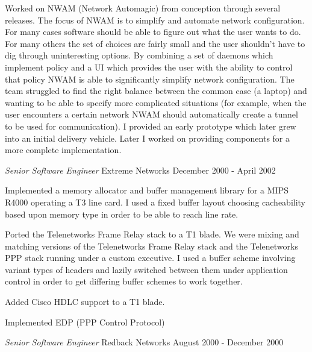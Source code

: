 \documentclass[margin]{res}
\begin{document}
\begin{resume}
                Worked on NWAM (Network Automagic) from conception
                through several releases. The focus of NWAM is to
                simplify and automate network configuration. For many
                cases software should be able to figure out what the
                user wants to do. For many others the set of choices are
                fairly small and the user shouldn't have to dig through
                uninteresting options. By combining a set of daemons
                which implement policy and a UI which provides the user
                with the ability to control that policy NWAM is able
                to significantly simplify network configuration. The
                team struggled to find the right balance between the
                common case (a laptop) and wanting to be able to specify
                more complicated situations (for example, when the user
                encounters a certain network NWAM should automatically
                create a tunnel to be used for communication). I
                provided an early prototype which later grew into an
                initial delivery vehicle. Later I worked on providing
                components for a more complete implementation.

                {\sl\large Senior Software Engineer} Extreme Networks \hfill December 2000 - April 2002

                Implemented a memory allocator and buffer management library for a MIPS
                R4000 operating a T3 line card. I used a fixed buffer layout choosing
                cacheability based upon memory type in order to be able to reach line
                rate.

                Ported the Telenetworks Frame Relay stack to a T1 blade. We were mixing
                and matching versions of the Telenetworks Frame Relay stack and the
                Telenetworks PPP stack running under a custom executive. I used a buffer
                scheme involving variant types of headers and lazily switched between
                them under application control in order to get differing buffer schemes
                to work together.

                Added Cisco HDLC support to a T1 blade.

                Implemented EDP (PPP Control Protocol)

                {\sl\large Senior Software Engineer} Redback  Networks \hfill August 2000 - December 2000


\end{resume}
\end{document}

